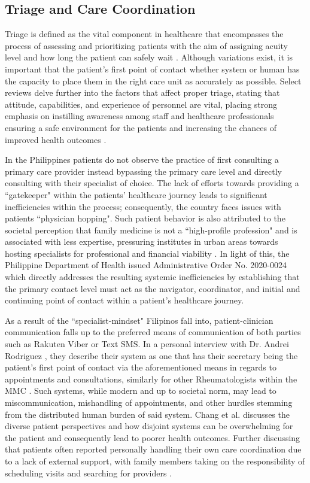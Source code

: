 \documentclass[11pt,a4paper,titlepage]{article}
\begin{document}
	\subsection{Triage and Care Coordination} 
	Triage is defined as the vital component in healthcare that encompasses the process of assessing and prioritizing patients with the aim of assigning acuity level and how long the patient can safely wait \cite{peta_2023_triage}. Although variations exist, it is important that the patient's first point of contact whether system or human has the capacity to place them in the right care unit as accurately as possible. Select reviews delve further into the factors that affect proper triage, stating that attitude, capabilities, and experience of personnel are vital, placing  strong emphasis on instilling awareness among staff and healthcare professionals ensuring a safe environment for the patients and increasing the chances of improved health outcomes \cite{fekonja_2023_factors, gorick_2022_factors}. 
	
	In the Philippines patients do not observe the practice of first consulting a primary care provider instead bypassing the primary care level and directly consulting with their specialist of choice. The lack of efforts towards providing a ``gatekeeper" within the patients' healthcare journey leads to significant inefficiencies within the process; consequently, the country faces issues with patients ``physician hopping". Such patient behavior is also attributed to the societal perception that family medicine is not a ``high-profile profession" and is associated with less expertise, pressuring institutes in urban areas towards hosting specialists for professional and financial viability \cite{Lajeunesse2012}. In light of this, the Philippine Department of Health \cite{DOH_AO_2020_0024} issued Administrative Order No. 2020-0024 which directly addresses the resulting systemic inefficiencies by establishing that the primary contact level must act as the navigator, coordinator, and initial and continuing point of contact within a patient's healthcare journey.
	
	As a result of the ``specialist-mindset" Filipinos fall into, patient-clinician communication falls up to the preferred means of communication of both parties such as Rakuten Viber or Text SMS. In a personal interview with Dr. Andrei Rodriguez \cite{Rodriguez_A}, they describe their system as one that has their secretary being the patient's first point of contact via the aforementioned means in regards to appointments and consultations, similarly for other Rheumatologists within the MMC . Such systems, while modern and up to societal norm, may lead to miscommunication, mishandling of appointments, and other hurdles stemming from the distributed human burden of said system. Chang et al. \cite{Chang682} discusses the diverse patient perspectives and how disjoint systems can be overwhelming for the patient and consequently lead to poorer health outcomes. Further discussing that patients often reported personally handling their own care coordination due to a lack of external support, with family members taking on the responsibility of scheduling visits and searching for providers .
	
\end{document}
